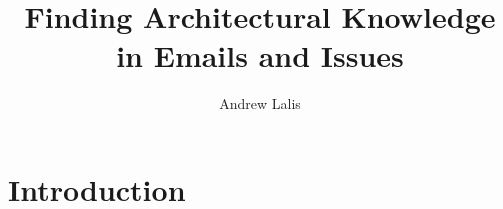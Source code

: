 \documentclass{article}
\title{Finding Architectural Knowledge in Emails and Issues}
\author{Andrew Lalis}
\begin{document}
\maketitle

\section*{Introduction}
	\begin{multicols}{2}
		
	\end{multicols}
\end{document}
